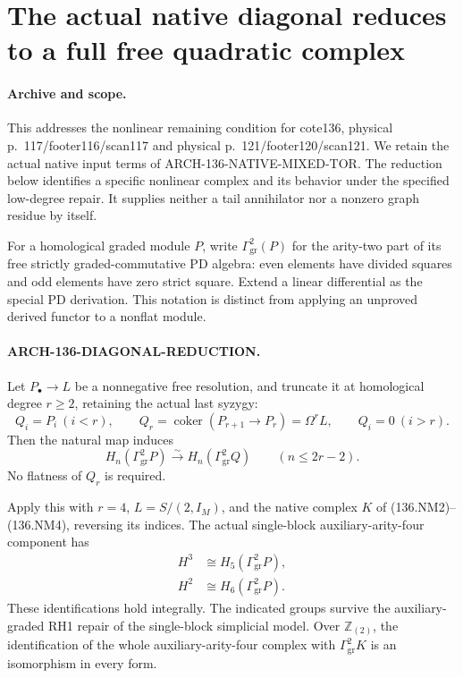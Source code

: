 \section{The actual native diagonal reduces to a full free quadratic complex}
\label{sec:136-diagonal-reduction}

\paragraph{Archive and scope.}
This addresses the nonlinear remaining condition for cote136,
physical p.~117/footer116/scan117 and physical
p.~121/footer120/scan121. We retain the actual native input
terms of ARCH-136-NATIVE-MIXED-TOR. The reduction below
identifies a specific nonlinear complex and its behavior under
the specified low-degree repair. It supplies neither a tail
annihilator nor a nonzero graph residue by itself.

For a homological graded module \(P\), write
\(\Gamma^2_{\mathrm{gr}}(P)\) for the arity-two part of its
free strictly graded-commutative PD algebra: even elements have
divided squares and odd elements have zero strict square.
Extend a linear differential as the special PD derivation.
This notation is distinct from applying an unproved derived
functor to a nonflat module.

\paragraph{ARCH-136-DIAGONAL-REDUCTION.}
Let \(P_\bullet\to L\) be a nonnegative free resolution,
and truncate it at homological degree \(r\geq2\), retaining
the actual last syzygy:
\[
 Q_i=P_i\ (i<r),\qquad
 Q_r=\operatorname{coker}(P_{r+1}\to P_r)=\Omega^rL,
 \qquad Q_i=0\ (i>r).
                                                               \tag{136.DR1}
\]
Then the natural map induces
\[
 H_n(\Gamma^2_{\mathrm{gr}}P)\xrightarrow{\sim}
 H_n(\Gamma^2_{\mathrm{gr}}Q)
                              \qquad(n\leq2r-2).
                                                               \tag{136.DR2}
\]
No flatness of \(Q_r\) is required.

Apply this with \(r=4\), \(L=S/(2,I_M)\), and the native
complex \(K\) of (136.NM2)--(136.NM4), reversing its indices.
The actual single-block auxiliary-arity-four component has
\[
 \begin{aligned}
 H^3&\cong H_5(\Gamma^2_{\mathrm{gr}}P),\\
 H^2&\cong H_6(\Gamma^2_{\mathrm{gr}}P).
 \end{aligned}                                                   \tag{136.DR3}
\]
These identifications hold integrally. The indicated groups
survive the auxiliary-graded RH1 repair of the single-block
simplicial model. Over \(\mathbb Z_{(2)}\), the identification
of the whole auxiliary-arity-four complex with
\(\Gamma^2_{\mathrm{gr}}K\) is an isomorphism in every form.

